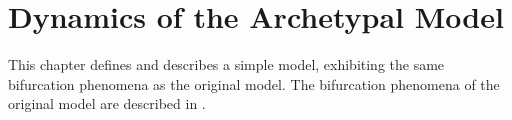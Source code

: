 \chapter{Dynamics of the Archetypal Model}
\label{chap:dynarch}

This chapter defines and describes a simple model, exhibiting the same bifurcation phenomena as the original model.
The bifurcation phenomena of the original model are described in .







